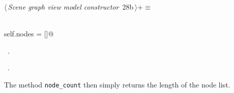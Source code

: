 \documentclass[
    a4paper,      %
    10pt,         %
    openright,    %
    notitlepage,  %
    parskip=half, %
]{scrreprt}       %
\theoremstyle{definition}                    %
\begin{document}
\begin{flushleft} \small
\begin{minipage}{\linewidth}\label{scrap28}\raggedright\small
{} $\langle\,${\itshape Scene graph view model constructor}\nobreak\ {\footnotesize {28b}}$\,\rangle+\equiv$
\vspace{-1ex}
\begin{list}{}{} \item
\mbox{}\lstinline@@\\
\mbox{}\lstinline@    self.nodes = []@\\
\mbox{}\lstinline@@{\NWsep}
\end{list}
\vspace{-1.5ex}
\footnotesize
\begin{list}{}{\setlength{\itemsep}{-\parsep}\setlength{\itemindent}{-\leftmargin}}
\item \NWtxtMacroDefBy\ .
\item \NWtxtMacroRefIn\ .

\item{}
\end{list}
\end{minipage}\vspace{4ex}
\end{flushleft}
The method \verb+node_count+ then simply returns the length of the node list.
\end{document}
